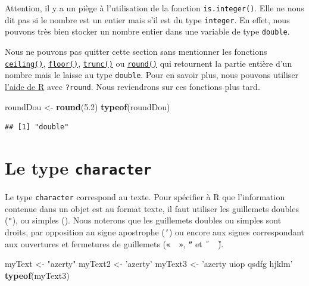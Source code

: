 \documentclass[twoside,symmetric]{book}
\newenvironment{Shaded}{}{}
\newcommand{\FloatTok}[1]{#1}
\newcommand{\KeywordTok}[1]{\textbf{#1}}
\newcommand{\NormalTok}[1]{#1}
\newcommand{\StringTok}[1]{#1}
\begin{document}
Attention, il y a un piège à l'utilisation de la fonction \texttt{is.integer()}. Elle ne nous dit pas si le nombre est un entier mais s'il est du type \texttt{integer}. En effet, nous pouvons très bien stocker un nombre entier dans une variable de type \texttt{double}.

Nous ne pouvons pas quitter cette section sans mentionner les fonctions \protect\hyperlink{l015round}{\texttt{ceiling()}}, \protect\hyperlink{l015round}{\texttt{floor()}}, \protect\hyperlink{l015round}{\texttt{trunc()}} ou \protect\hyperlink{l015round}{\texttt{round()}} qui retournent la partie entière d'un nombre mais le laisse au type \texttt{double}. Pour en savoir plus, nous pouvons utiliser \protect\hyperlink{l015help}{l'aide de R} avec \texttt{?round}. Nous reviendrons sur ces fonctions plus tard.

\begin{Shaded}
\begin{Highlighting}[]
\NormalTok{roundDou <-}\StringTok{ }\KeywordTok{round}\NormalTok{(}\FloatTok{5.2}\NormalTok{)}
\KeywordTok{typeof}\NormalTok{(roundDou)}
\end{Highlighting}
\end{Shaded}

\begin{verbatim}
## [1] "double"
\end{verbatim}

\hypertarget{le-type-character}{%
\section{\texorpdfstring{Le type \texttt{character}}{Le type character}}\label{le-type-character}}

Le type \texttt{character} correspond au texte. Pour spécifier à R que l'information contenue dans un objet est au format texte, il faut utiliser les guillemets doubles (\texttt{"}), ou simples (\texttt{\textquotesingle{}}). Nous noterons que les guillemets doubles ou simples sont droits, par opposition au signe apostrophe (\texttt{’}) ou encore aux signes correspondant aux ouvertures et fermetures de guillemets (\texttt{«\ \ »}, \texttt{ˮ} et \texttt{˝\ \ ̏}).

\begin{Shaded}
\begin{Highlighting}[]
\NormalTok{myText <-}\StringTok{ "azerty"}
\NormalTok{myText2 <-}\StringTok{ 'azerty'}
\NormalTok{myText3 <-}\StringTok{ 'azerty uiop qsdfg hjklm'}
\KeywordTok{typeof}\NormalTok{(myText3)}
\end{Highlighting}
\end{Shaded}
\end{document}
